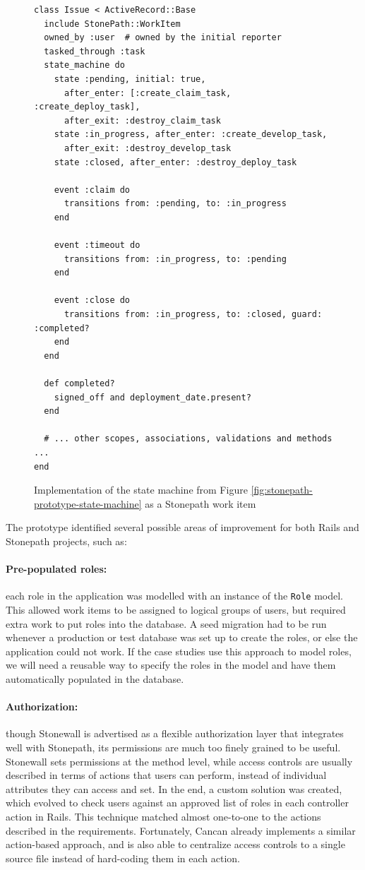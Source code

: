 \begin{figure}[!ht]
  \begin{lstlisting}
class Issue < ActiveRecord::Base
  include StonePath::WorkItem
  owned_by :user  # owned by the initial reporter
  tasked_through :task
  state_machine do
    state :pending, initial: true,
      after_enter: [:create_claim_task, :create_deploy_task],
      after_exit: :destroy_claim_task
    state :in_progress, after_enter: :create_develop_task,
      after_exit: :destroy_develop_task
    state :closed, after_enter: :destroy_deploy_task

    event :claim do
      transitions from: :pending, to: :in_progress
    end

    event :timeout do
      transitions from: :in_progress, to: :pending
    end

    event :close do
      transitions from: :in_progress, to: :closed, guard: :completed?
    end
  end

  def completed?
    signed_off and deployment_date.present?
  end

  # ... other scopes, associations, validations and methods ...
end
  \end{lstlisting}
  \caption{Implementation of the state machine from Figure \ref{fig:stonepath-prototype-state-machine} as a Stonepath work item}
  \label{fig:stonepath-prototype-workitem}
\end{figure}

The prototype identified several possible areas of improvement for both Rails and Stonepath projects, such as:

\paragraph{Pre-populated roles:} each role in the application was modelled with an instance of the \verb!Role! model. This allowed work items to be assigned to logical groups of users, but required extra work to put roles into the database. A seed migration had to be run whenever a production or test database was set up to create the roles, or else the application could not work. If the case studies use this approach to model roles, we will need a reusable way to specify the roles in the model and have them automatically populated in the database.

\paragraph{Authorization:} though Stonewall is advertised as a flexible authorization layer that integrates well with Stonepath, its permissions are much too finely grained to be useful. Stonewall sets permissions at the method level, while access controls are usually described in terms of actions that users can perform, instead of individual attributes they can access and set. In the end, a custom solution was created, which evolved to check users against an approved list of roles in each controller action in Rails. This technique matched almost one-to-one to the actions described in the requirements. Fortunately, Cancan already implements a similar action-based approach, and is also able to centralize access controls to a single source file instead of hard-coding them in each action.

